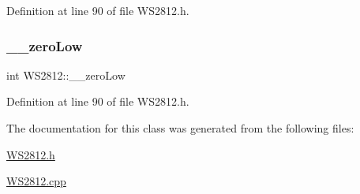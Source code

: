 Definition at line 90 of file W\+S2812.\+h.

\mbox{\label{class_w_s2812_addde539bd94ea4a670420c22cace2216}} 
\subsubsection{\texorpdfstring{\+\_\+\+\_\+zero\+Low}{\_\_zeroLow}}
{\footnotesize\ttfamily int W\+S2812\+::\+\_\+\+\_\+zero\+Low\hspace{0.3cm}{\ttfamily [private]}}



Definition at line 90 of file W\+S2812.\+h.



The documentation for this class was generated from the following files\+:\begin{DoxyCompactItemize}
\item 
\hyperlink{_w_s2812_8h}{W\+S2812.\+h}\item 
\hyperlink{_w_s2812_8cpp}{W\+S2812.\+cpp}\end{DoxyCompactItemize}
